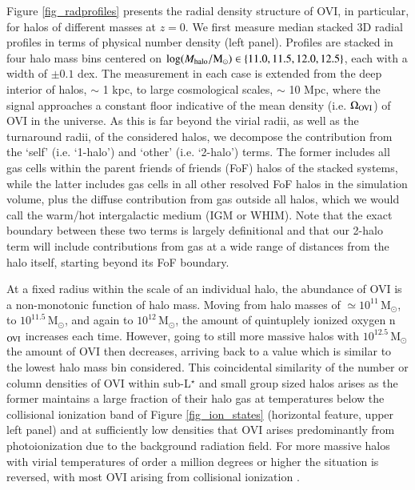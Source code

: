 \documentclass[useAMS,usenatbib]{mnras}
\newcommand{\msun}{\,M$_{\odot}$\xspace}
\newcommand{\ovi}{OVI\xspace}
\begin{document}
Figure \ref{fig_radprofiles} presents the radial density structure of \ovi, in particular, for halos of different masses at $z=0$. We first measure median stacked 3D radial profiles in terms of physical number density (left panel). Profiles are stacked in four halo mass bins centered on $\log(M_{\rm halo}/\rm{M}_\odot) \in \{11.0,11.5,12.0,12.5\}$, each with a width of $\pm 0.1$ dex. The measurement in each case is extended from the deep interior of halos, $\sim$ 1 kpc, to large cosmological scales, $\sim$ 10 Mpc, where the signal approaches a constant floor indicative of the mean density (i.e. $\Omega_{\rm OVI}$) of \ovi in the universe. As this is far beyond the virial radii, as well as the turnaround radii, of the considered halos, we decompose the contribution from the `self' (i.e. `1-halo') and `other' (i.e. `2-halo') terms. The former includes all gas cells within the parent friends of friends (FoF) halos of the stacked systems, while the latter includes gas cells in all other resolved FoF halos in the simulation volume, plus the diffuse contribution from gas outside all halos, which we would call the warm/hot intergalactic medium (IGM or WHIM). Note that the exact boundary between these two terms is largely definitional and that our 2-halo term will include contributions from gas at a wide range of distances from the halo itself, starting beyond its FoF boundary.

At a fixed radius within the scale of an individual halo, the abundance of \ovi is a non-monotonic function of halo mass. Moving from halo masses of $\simeq 10^{11}$\msun, to $10^{11.5}$\msun, and again to $10^{12}$\msun, the amount of quintuplely ionized oxygen n$_{\rm OVI}$ increases each time. However, going to still more massive halos with $10^{12.5}$\msun the amount of \ovi then decreases, arriving back to a value which is similar to the lowest halo mass bin considered. This coincidental similarity of the number or column densities of \ovi within sub-L$^\star$ and small group sized halos arises as the former maintains a large fraction of their halo gas at temperatures below the collisional ionization band of Figure \ref{fig_ion_states} (horizontal feature, upper left panel) and at sufficiently low densities that \ovi arises predominantly from photoionization due to the background radiation field. For more massive halos with virial temperatures of order a million degrees or higher the situation is reversed, with most \ovi arising from collisional ionization \citep[see also][]{turner15}.
\end{document}
